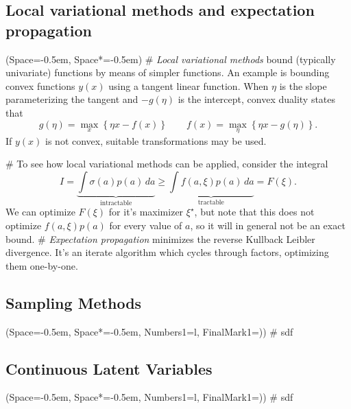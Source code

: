 \documentclass[12pt, a4paper]{article}
\newcommand{\listSpace}{-0.5em}%
\begin{document}
\subsection*{Local variational methods and expectation propagation}
\begin{easylist}[itemize]
	\ListProperties(Space=\listSpace, Space*=\listSpace)
	# \emph{Local variational methods} bound (typically univariate) functions by means of simpler functions.
	An example is bounding convex functions $y(x)$ using a tangent linear function.
	When $\eta$ is the slope parameterizing the tangent and $-g(\eta)$ is the intercept, convex duality states that
	\begin{equation*}
		g(\eta) = \max_x \left\{ \eta x - f(x) \right\}
		\qquad 
		f(x) = \max_\eta \left\{ \eta x - g(\eta) \right\}.
	\end{equation*}
	If $y(x)$ is not convex, suitable transformations may be used.
	
	# To see how local variational methods can be applied, consider the integral
	\begin{equation*}
		I = \underbrace{\int \sigma(a) p (a) \, da}_{\text{intractable}} \geq 
		\underbrace{\int f(a, \xi) p (a) \, da}_{\text{tractable}} = F(\xi).
	\end{equation*}
	We can optimize $F(\xi)$ for it's maximizer $\xi^{\star}$, but note that this does not optimize $f(a, \xi) p (a)$ for every value of $a$, so it will in general not be an exact bound.
	# \emph{Expectation propagation} minimizes the reverse Kullback Leibler divergence. 
	It's an iterate algorithm which cycles through factors, optimizing them one-by-one.
	
\end{easylist}

\subsection{Sampling Methods}
\begin{easylist}[itemize]
	\ListProperties(Space=\listSpace, Space*=\listSpace, Numbers1=l, FinalMark1={)})
	# sdf
\end{easylist}

\subsection{Continuous Latent Variables}
\begin{easylist}[itemize]
	\ListProperties(Space=\listSpace, Space*=\listSpace, Numbers1=l, FinalMark1={)})
	# sdf
\end{easylist}
\end{document}
